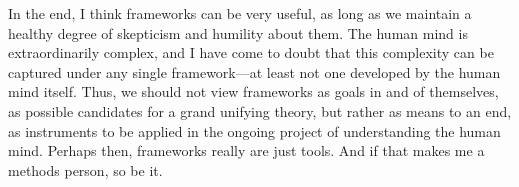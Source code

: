 In the end, I think frameworks can be very useful, as long as we maintain a healthy degree of skepticism and humility about them. The human mind is extraordinarily complex, and I have come to doubt that this complexity can be captured under any single framework---at least not one developed by the human mind itself. Thus, we should not view frameworks as goals in and of themselves, as possible candidates for a grand unifying theory, but rather as means to an end, as instruments to be applied in the ongoing project of understanding the human mind. Perhaps then, frameworks really are just tools. And if that makes me a methods person, so be it.




